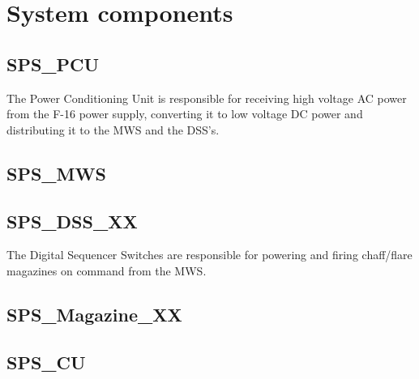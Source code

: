 \documentclass[Main]{subfiles}
\begin{document}
\section{System components}

\subsection{SPS\_PCU}
The Power Conditioning Unit is responsible for receiving high voltage AC power from the F-16 power supply, converting it to low voltage DC power and distributing it to the MWS and the DSS's.

\subsection{SPS\_MWS}

\subsection{SPS\_DSS\_XX}
The Digital Sequencer Switches are responsible for powering and firing chaff/flare magazines on command from the MWS.

\subsection{SPS\_Magazine\_XX}

\subsection{SPS\_CU}
\end{document}
